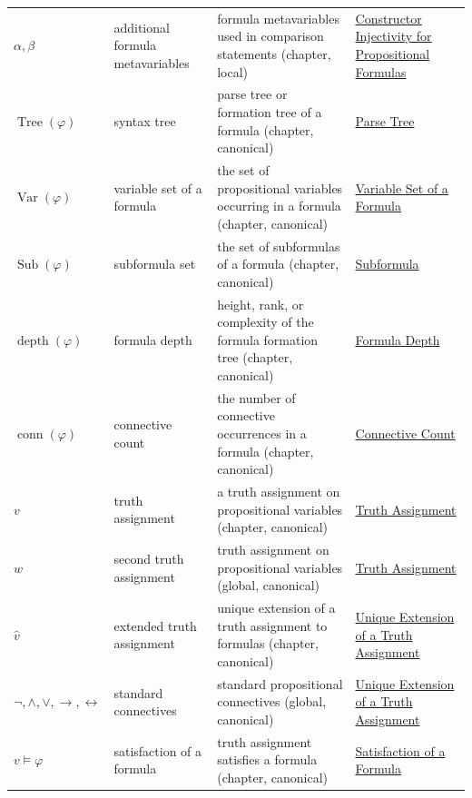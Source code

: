 \begin{longtable}{p{}p{}p{}p{}}
\(\alpha,\beta\) & additional formula metavariables & formula metavariables used in comparison statements (chapter, local) & \hyperref[lem:constructor-injectivity-propositional-formulas]{Constructor Injectivity for Propositional Formulas}\\
\(\operatorname{Tree}(\varphi)\) & syntax tree & parse tree or formation tree of a formula (chapter, canonical) & \hyperref[def:parse-tree-propositional-logic]{Parse Tree}\\
\(\operatorname{Var}(\varphi)\) & variable set of a formula & the set of propositional variables occurring in a formula (chapter, canonical) & \hyperref[def:formula-variable-set-propositional-logic]{Variable Set of a Formula}\\
\(\operatorname{Sub}(\varphi)\) & subformula set & the set of subformulas of a formula (chapter, canonical) & \hyperref[def:subformula-propositional-logic]{Subformula}\\
\(\operatorname{depth}(\varphi)\) & formula depth & height, rank, or complexity of the formula formation tree (chapter, canonical) & \hyperref[def:formula-depth-propositional-logic]{Formula Depth}\\
\(\operatorname{conn}(\varphi)\) & connective count & the number of connective occurrences in a formula (chapter, canonical) & \hyperref[def:connective-count-propositional-logic]{Connective Count}\\
\(v\) & truth assignment & a truth assignment on propositional variables (chapter, canonical) & \hyperref[def:truth-assignment-propositional-logic]{Truth Assignment}\\
\(w\) & second truth assignment & truth assignment on propositional variables (global, canonical) & \hyperref[def:truth-assignment-propositional-logic]{Truth Assignment}\\
\(\widehat v\) & extended truth assignment & unique extension of a truth assignment to formulas (chapter, canonical) & \hyperref[thm:unique-extension-truth-assignment-propositional-logic]{Unique Extension of a Truth Assignment}\\
\(\neg,\land,\lor,\to,\leftrightarrow\) & standard connectives & standard propositional connectives (global, canonical) & \hyperref[thm:unique-extension-truth-assignment-propositional-logic]{Unique Extension of a Truth Assignment}\\
\(v\models\varphi\) & satisfaction of a formula & truth assignment satisfies a formula (chapter, canonical) & \hyperref[def:satisfaction-propositional-formula]{Satisfaction of a Formula}\\

\end{longtable}
